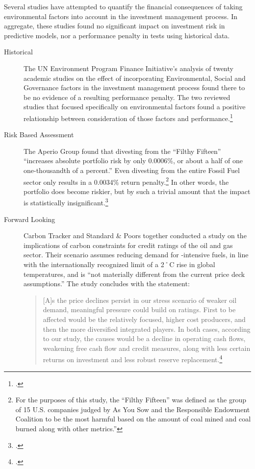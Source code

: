 Several studies have attempted to quantify the financial consequences of taking environmental factors into account in the investment management process.
In aggregate, these studies found no significant impact on investment risk in predictive models, nor a performance penalty in tests using historical data.
\begin{description}
  \item[Historical] The UN Environment Program Finance Initiative's analysis of twenty academic studies on the effect of incorporating Environmental, Social and Governance factors in the investment management process found there to be no evidence of a resulting performance penalty. The two reviewed studies that focused specifically on environmental factors found a positive relationship between consideration of those factors and performance.\footcite{UNEPFI2007}
  \item[Risk Based Assessment] The Aperio Group found that divesting from the ``Filthy Fifteen'' ``increases absolute portfolio risk by only 0.0006\%, or about a half of one one-thousandth of a percent.'' Even divesting from the entire Fossil Fuel sector only results in a 0.0034\% return penalty.\footnote{For the purposes of this study, the ``Filthy Fifteen'' was defined as the group of 15 U.S. companies judged by As You Sow and the Responsible Endowment Coalition to be the most harmful based on the amount of coal mined and coal burned along with other metrics.''} In other words, the portfolio does become riskier, but by such a trivial amount that the impact is statistically insignificant.\footcite{Aperio2013}
  \item[Forward Looking] Carbon Tracker and Standard \& Poors together conducted a study on the implications of carbon constraints for credit ratings of the oil and gas sector. Their scenario assumes reducing demand for -intensive fuels, in line with the internationally recognized limit of a 2˚C rise in global temperatures, and is ``not materially different from the current price deck assumptions.'' The study concludes with the statement:
\begin{quote} 
[A]s the price declines persist in our stress scenario of weaker oil demand, meaningful pressure could build on ratings. First to be affected would be the relatively focused, higher cost producers, and then the more diversified integrated players. In both cases, according to our study, the causes would be a decline in operating cash flows, weakening free cash flow and credit measures, along with less certain returns on investment and less robust reserve replacement.\footcite{SandPConstrained}

\end{quote}
\end{description}
